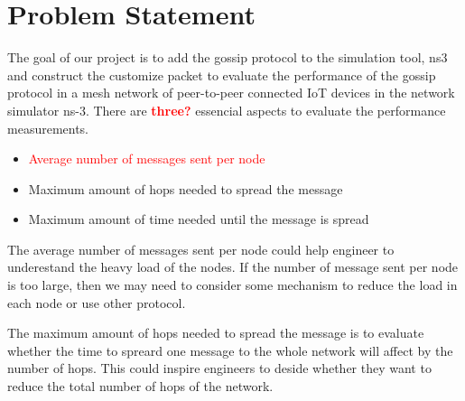 \documentclass[12pt,journal]{IEEEtran}
\begin{document}

\section{Problem Statement}\label{sec:problem}

The goal of our project is to add the gossip protocol to the simulation tool, ns3 and construct the customize packet to evaluate the performance of the gossip protocol in a mesh network of peer-to-peer connected IoT devices in the network simulator ns-3. There are \textcolor{red}{\textbf{three?}} essencial aspects to evaluate the performance measurements.
\begin{itemize}
 \item \textcolor{red}{ Average number of messages sent per node}
 \item Maximum amount of hops needed to spread the message
 \item Maximum amount of time needed until the message is spread
\end{itemize}

The average number of messages sent per node could help engineer to underestand the heavy load of the nodes. If the number of message sent per node is too large, then we may need to consider some mechanism to reduce the load in each node or use other protocol.

The maximum amount of hops needed to spread the message is to evaluate whether the time to spreard one message to the whole network will affect by the number of hops. This could inspire engineers to deside whether they want to reduce the total number of hops of the network.
\end{document}
